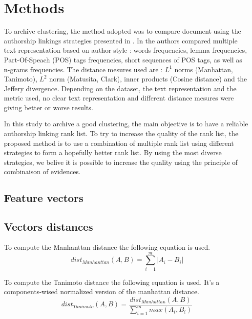 \section{Methods}

To archive clustering, the method adopted was to compare document using the authorship linkings strategies presented in \cite{kocher_verification}.
In \cite{kocher_verification} the authors compared multiple text representation based on author style : words frequencies, lemma frequencies, Part-Of-Speach (POS) tags frequencies, short sequences of POS tags, as well as n-grams frequencies.
The distance mesures used are : $L^1$ norms (Manhattan, Tanimoto), $L^2$ norm (Matusita, Clark), inner products (Cosine distance) and the Jeffery divergence.
Depending on the dataset, the text representation and the metric used, no clear text representation and different distance mesures were giving better or worse results.

In this study to archive a good clustering, the main objective is to have a reliable authorship linking rank list.
To try to increase the quality of the rank list, the proposed method is to use a combination of multiple rank list using different strategies to form a hopefully better rank list.
By using the most diverse strategies, we belive it is possible to increase the quality using the principle of combinaison of evidences.

\subsection{Feature vectors}



\subsection{Vectors distances}

\begin{definition}
  To compute the Manhanttan distance the following equation is used.
  \begin{equation}
    dist_{Manhanttan}(A, B) = \sum_{i=1}^{m} |A_i - B_i|
  \end{equation}
\end{definition}

\begin{definition}
  To compute the Tanimoto distance the following equation is used. It's a components-wised normalized version of the manhattan distance.
  \begin{equation}
    dist_{Tanimoto}(A, B) = \frac{dist_{Manhattan}(A, B)}{\sum_{i=1}^{m} max(A_i, B_i)}
  \end{equation}
\end{definition}


